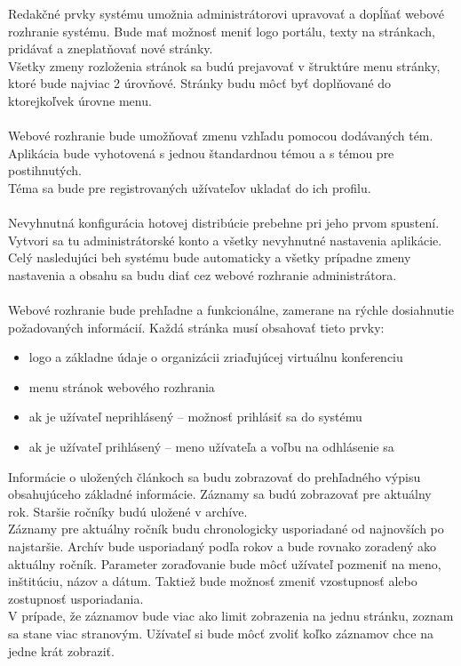 Redakčné prvky systému umožnia administrátorovi upravovať a dopĺňať webové rozhranie systému. Bude mať možnosť meniť logo portálu, texty na stránkach, pridávať a zneplatňovať nové stránky. \\
Všetky zmeny rozloženia stránok sa budú prejavovať v štruktúre menu stránky, ktoré bude najviac 2 úrovňové. Stránky budu môcť byť doplňované do ktorejkoľvek úrovne menu.\\ \\

Webové rozhranie bude umožňovať zmenu vzhľadu pomocou dodávaných tém. Aplikácia bude vyhotovená s jednou štandardnou témou a s témou pre postihnutých. \\
Téma sa bude pre registrovaných užívateľov ukladať do ich profilu.\\ \\

Nevyhnutná konfigurácia hotovej distribúcie prebehne pri jeho prvom spustení. Vytvori sa tu administrátorské konto a všetky nevyhnutné nastavenia aplikácie. \\
Celý nasledujúci beh systému bude automaticky a všetky prípadne zmeny nastavenia a obsahu sa budu diať cez webové rozhranie administrátora. \\ \\

Webové rozhranie bude prehľadne a funkcionálne, zamerane na rýchle dosiahnutie požadovaných informácií. Každá stránka musí obsahovať tieto prvky:
\begin{center}
\begin{itemize}
\item logo a základne údaje o organizácii zriaďujúcej virtuálnu konferenciu
\item menu stránok webového rozhrania
\item ak je užívateľ neprihlásený -- možnosť prihlásiť sa do systému
\item ak je užívateľ prihlásený -- meno užívateľa a voľbu na odhlásenie sa
\end{itemize}
\end{center}

Informácie o uložených článkoch sa budu zobrazovať do prehľadného výpisu obsahujúceho základné informácie. Záznamy sa budú zobrazovať pre aktuálny rok. Staršie ročníky budú uložené v archíve. \\
Záznamy pre aktuálny ročník budu chronologicky usporiadané od najnovších po najstaršie. Archív bude usporiadaný podľa rokov a bude rovnako zoradený ako aktuálny ročník. Parameter zoraďovanie bude môcť užívateľ pozmeniť na meno, inštitúciu, názov a dátum. Taktiež bude možnosť zmeniť vzostupnosť alebo zostupnosť usporiadania.\\
V prípade, že záznamov bude viac ako limit zobrazenia na jednu stránku, zoznam sa stane viac stranovým. Užívateľ si bude môcť zvoliť koľko záznamov chce na jedne krát zobraziť.\\ \\

